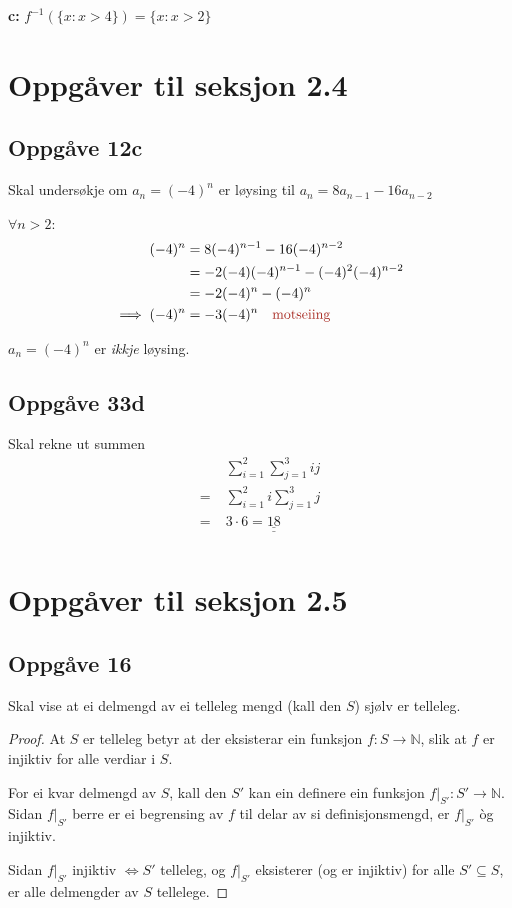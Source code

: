 \documentclass[a4paper, 11pt]{article}
\newcommand{\deloppg}[1]{\vspace{1mm}\noindent \textbf{\themecolor{#1:}}}
\newcommand{\themeshade}{Mahogany}
\newcommand{\themecolor}[1]{\textcolor{\themeshade}{#1}}
\def\dul#1{\underline{\underline{#1}}}
\begin{document}
\vspace{3mm}
\deloppg{c} \(f^{-1}(\{x: x > 4\}) = \{x : x > 2\}\)

\section{Oppgåver til seksjon 2.4} %

\subsection*{Oppgåve 12c}
Skal undersøkje om \(a_n = (-4)^n\) er løysing til \(a_n = 8a_{n-1} - 16a_{n-2}\)

\noindent \(\forall n > 2\):
\begin{align*}
    (-4)^n &= 8(-4)^{n-1} - 16(-4)^{n-2} \\
    &= -2(-4)(-4)^{n-1} - (-4)^2(-4)^{n-2} \\
    &= -2(-4)^n - (-4)^n \\
    \implies (-4)^n &= -3(-4)^n \quad \text{\themecolor{motseiing}}
\end{align*}

\noindent \(a_n = (-4)^n\) er {\em ikkje} løysing.


\subsection*{Oppgåve 33d}
Skal rekne ut summen
\begin{align*}
    &\sum_{i=1}^2\sum_{j=1}^3 ij \\
    =\;&\sum_{i=1}^2i\sum_{j=1}^3j \\
    =\;&3 \cdot 6 = \dul{18}\\
\end{align*}

\newpage
\section{Oppgåver til seksjon 2.5} %
\subsection*{Oppgåve 16}
Skal vise at ei delmengd av ei telleleg mengd (kall den \(S\)) sjølv er telleleg.

\begin{proof}
    At \(S\) er telleleg betyr at der eksisterar ein funksjon \(f: S \rightarrow \mathbb{N}\), slik at \(f\)
    er injiktiv for alle verdiar i \(S\).

    For ei kvar delmengd av \(S\), kall den \(S'\) kan ein definere ein 
    funksjon \(f|_{S'}: S' \rightarrow \mathbb{N}\). Sidan \(f|_{S'}\) berre er ei begrensing av \(f\) til
    delar av si definisjonsmengd, er \(f|_{S'}\) òg injiktiv.

    \vspace{3mm}\noindent
    Sidan \(f|_{S'}\) injiktiv \(\iff S'\) telleleg, og \(f|_{S'}\) eksisterer (og er injiktiv) for alle \(S' \subseteq S\), er
    alle delmengder av \(S\) tellelege.
\end{proof}
\end{document}
